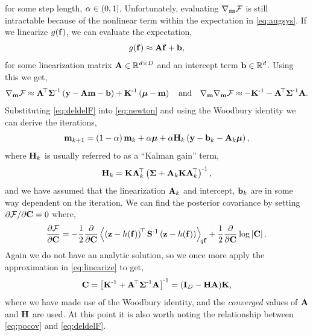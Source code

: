 \documentclass{article} %
\begin{document}
for some step length, $\step \in (0, 1]$. Unfortunately, evaluating
$\nabla_\pomean\Fengy$ is still intractable because of the nonlinear term
within the expectation in \eqref{eq:augsys}. If we linearize
$\nonlin{\lstate}$, we can evaluate the expectation,
\begin{equation}
    \nonlin{\lstate} \approx \Linmat\lstate + \intcpt,
    \label{eq:linearize}
\end{equation}
for some linearization matrix $\Linmat \in \real{d \times D}$ and an intercept
term $\intcpt \in \real{d}$. Using this we get,
\begin{equation}
    \nabla_\pomean \Fengy
        \approx \Linmat\transpose\lcov\inv\brac{\obs - \Linmat\pomean 
            - \intcpt} + \prcov\inv\brac{\prmean - \pomean}
    \quad \text{and} \quad
    \nabla_\pomean \nabla_\pomean \Fengy
        \approx - \prcov\inv - \Linmat\transpose\lcov\inv\Linmat.
        \label{eq:deldelF}
\end{equation}
Substituting \eqref{eq:deldelF} into \eqref{eq:newton} and using the Woodbury
identity we can derive the iterations,
\begin{equation}
    \pomean_{k+1} = \brac{1-\step}\pomean_k + \step\prmean 
        + \step\Kgain_k\brac{\obs - \intcpt_k - \Linmat_k\prmean},
    \label{eq:pomean}
\end{equation}
where $\Kgain_k$ is usually referred to as  a ``Kalman gain'' term,
\begin{equation}
    \Kgain_k = \prcov\Linmat_k\transpose\brac{\lcov +
        \Linmat_k\prcov\Linmat_k\transpose}\inv,
    \label{eq:kgain}
\end{equation}
and we have assumed that the linearization $\Linmat_k$ and intercept,
$\intcpt_k$ are in some way dependent on the iteration. We can find the 
posterior covariance by setting $\partial\Fengy/\partial\pocov = 0$ where,
\begin{equation}
    \frac{\partial\Fengy}{\partial\pocov} = -\frac{1}{2} 
        \frac{\partial}{\partial\pocov}
        \expec{q\lstate}{
            \brac{\augobs - \augnonlin{\lstate}}\transpose\augcov\inv
            \brac{\augobs - \augnonlin{\lstate}}
    } 
    + \frac{1}{2} \frac{\partial}{\partial\pocov} \log \deter{\pocov}.
\end{equation}
Again we do not have an analytic solution, so we once more apply the
approximation in \eqref{eq:linearize} to get,
\begin{equation}
    \pocov = \sbrac{\prcov\inv + \Linmat\transpose\lcov\inv\Linmat}\inv
    = \brac{\ident{D} - \Kgain\Linmat}\!\prcov,
    \label{eq:pocov}
\end{equation}
where we have made use of the Woodbury identity, and the \emph{converged}
values of $\Linmat$ and $\Kgain$ are used. At this point it is also worth
noting the relationship between \eqref{eq:pocov} and \eqref{eq:deldelF}.
\end{document}
